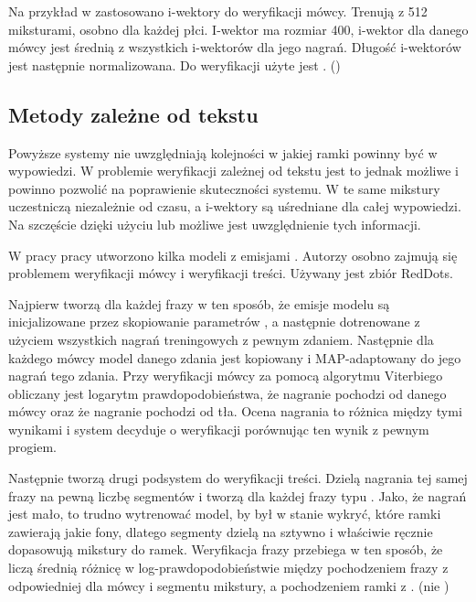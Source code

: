 Na przykład w \cite{utteranceVerificationFor}
zastosowano i-wektory do weryfikacji mówcy. Trenują  z 512 miksturami, osobno dla każdej płci.
I-wektor ma rozmiar 400, i-wektor dla danego mówcy jest średnią z wszystkich i-wektorów dla jego nagrań.
Długość i-wektorów jest następnie normalizowana. Do weryfikacji użyte jest
. ()


\subsection{Metody zależne od tekstu}

Powyższe systemy nie uwzględniają kolejności w jakiej ramki powinny być w wypowiedzi. W problemie weryfikacji
zależnej od tekstu jest to jednak możliwe i powinno pozwolić na poprawienie skuteczności systemu.
W  te same mikstury uczestniczą niezależnie od czasu, a i-wektory są uśredniane dla całej
wypowiedzi. Na szczęście dzięki użyciu  lub  możliwe jest uwzględnienie tych informacji\cite{parallelSpeakerAnd}.

W pracy \cite{parallelSpeakerAnd}
pracy utworzono kilka modeli  z emisjami . Autorzy osobno
zajmują się problemem weryfikacji mówcy i weryfikacji treści. Używany jest zbiór RedDots.

Najpierw tworzą  dla każdej frazy w ten sposób, że emisje modelu są inicjalizowane przez
skopiowanie parametrów ,
a następnie dotrenowane z użyciem wszystkich nagrań treningowych z pewnym zdaniem.
Następnie dla każdego mówcy model danego zdania jest kopiowany i MAP-adaptowany do jego nagrań tego zdania.
Przy weryfikacji mówcy za pomocą algorytmu Viterbiego obliczany jest logarytm
prawdopodobieństwa, że nagranie pochodzi od danego mówcy oraz że nagranie pochodzi od  tła.
Ocena nagrania to różnica między tymi wynikami i system decyduje o weryfikacji porównując ten wynik z pewnym progiem.

Następnie tworzą drugi podsystem do weryfikacji treści. Dzielą nagrania tej samej frazy na pewną liczbę segmentów
i tworzą dla każdej frazy  typu . Jako, że nagrań jest mało, to trudno
wytrenować model, by był w stanie wykryć, które ramki zawierają jakie fony, dlatego segmenty dzielą na sztywno
i właściwie ręcznie dopasowują mikstury do ramek. Weryfikacja frazy przebiega w ten sposób, że liczą średnią
różnicę w log-prawdopodobieństwie między pochodzeniem frazy z odpowiedniej dla mówcy i segmentu mikstury, a
pochodzeniem ramki z . (nie )

